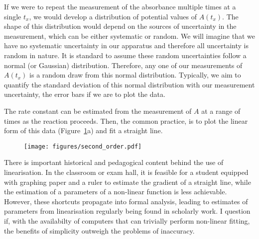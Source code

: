 \documentclass[reprint,superscriptaddress,nobibnotes,amsmath,amssymb]{revtex4-2}
\begin{document}
If we were to repeat the measurement of the absorbance multiple times at a single $t_x$, we would develop a distribution of potential values of $A(t_x)$.
The shape of this distribution would depend on the sources of uncertainty in the measurement, which can be either systematic or random. 
We will imagine that we have no systematic uncertainty in our apparatus and therefore all uncertainty is random in nature. 
It is standard to assume these random uncertainties follow a normal (or Gaussian) distribution. 
Therefore, any one of our measurements of $A(t_x)$ is a random draw from this normal distribution.
Typically, we aim to quantify the standard deviation of this normal distribution with our measurement uncertainty, the error bars if we are to plot the data. 

The rate constant can be estimated from the measurement of $A$ at a range of times as the reaction proceeds.
Then, the common practice, is to plot the linear form of this data (Figure~\ref{fig:second_order}a) and fit a straight line. 

%
\begin{figure}
  \texttt{[image: figures/second\_order.pdf]}
    
  \label{fig:second_order}
\end{figure}
%



There is important historical and pedagogical content behind the use of linearisation. 
In the classroom or exam hall, it is feasible for a student equipped with graphing paper and a ruler to estimate the gradient of a straight line, while the estimation of a parameters of a non-linear function is less achievable. 
However, these shortcuts propagate into formal analysis, leading to estimates of parameters from linearisation regularly being found in scholarly work. 
I question if, with the availabilty of computers that can trivially perform non-linear fitting, the benefits of simplicity outweigh the problems of inaccuracy.



\end{document}
